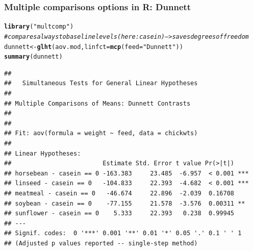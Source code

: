\documentclass{beamer}\usepackage[]{graphicx}\usepackage[]{color}
\makeatletter
\newcommand{\hlstr}[1]{\textcolor[rgb]{0.192,0.494,0.8}{#1}}%
\newcommand{\hlcom}[1]{\textcolor[rgb]{0.678,0.584,0.686}{\textit{#1}}}%
\newcommand{\hlstd}[1]{\textcolor[rgb]{0.345,0.345,0.345}{#1}}%
\newcommand{\hlkwb}[1]{\textcolor[rgb]{0.69,0.353,0.396}{#1}}%
\newcommand{\hlkwc}[1]{\textcolor[rgb]{0.333,0.667,0.333}{#1}}%
\newcommand{\hlkwd}[1]{\textcolor[rgb]{0.737,0.353,0.396}{\textbf{#1}}}%
\newenvironment{kframe}{%
 \def\at@end@of@kframe{}%
 \ifinner\ifhmode%
  \def\at@end@of@kframe{\end{minipage}}%
  \begin{minipage}{\columnwidth}%
 \fi\fi%
 \def\FrameCommand##1{\hskip\@totalleftmargin \hskip-\fboxsep
 \colorbox{shadecolor}{##1}\hskip-\fboxsep
     \hskip-\linewidth \hskip-\@totalleftmargin \hskip\columnwidth}%
 \MakeFramed {\advance\hsize-\width
   \@totalleftmargin\z@ \linewidth\hsize
   \@setminipage}}%
 {\par\unskip\endMakeFramed%
 \at@end@of@kframe}
\newenvironment{knitrout}{}{} %
\makeatother
\begin{document}
{{{
\begin{frame}[fragile]
\frametitle{Multiple comparisons options in R: Dunnett}
\begin{knitrout}\tiny
{}\color{fgcolor}\begin{kframe}
\begin{alltt}
\hlkwd{library}\hlstd{(}\hlstr{"multcomp"}\hlstd{)}
\hlcom{# compares always to baseline levels (here: casein) --> saves degrees of freedom}
\hlstd{dunnett} \hlkwb{<-} \hlkwd{glht}\hlstd{(aov.mod,} \hlkwc{linfct} \hlstd{=} \hlkwd{mcp}\hlstd{(}\hlkwc{feed} \hlstd{=} \hlstr{"Dunnett"}\hlstd{))}
\hlkwd{summary}\hlstd{(dunnett)}
\end{alltt}
\begin{verbatim}
## 
## 	 Simultaneous Tests for General Linear Hypotheses
## 
## Multiple Comparisons of Means: Dunnett Contrasts
## 
## 
## Fit: aov(formula = weight ~ feed, data = chickwts)
## 
## Linear Hypotheses:
##                         Estimate Std. Error t value Pr(>|t|)    
## horsebean - casein == 0 -163.383     23.485  -6.957  < 0.001 ***
## linseed - casein == 0   -104.833     22.393  -4.682  < 0.001 ***
## meatmeal - casein == 0   -46.674     22.896  -2.039  0.16708    
## soybean - casein == 0    -77.155     21.578  -3.576  0.00311 ** 
## sunflower - casein == 0    5.333     22.393   0.238  0.99945    
## ---
## Signif. codes:  0 '***' 0.001 '**' 0.01 '*' 0.05 '.' 0.1 ' ' 1
## (Adjusted p values reported -- single-step method)
\end{verbatim}
\end{kframe}
\end{knitrout}
\end{frame}


}}}
\end{document}
